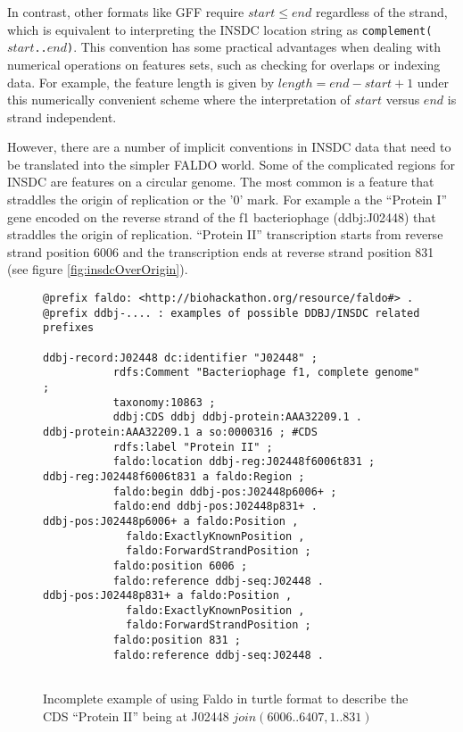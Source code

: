 In contrast, other formats like GFF require $start \leq end$
regardless of the strand, which is equivalent to interpreting
the INSDC location string as \texttt{complement($start$..$end$)}.
This convention has some practical advantages when
dealing with numerical operations on features sets, such as
checking for overlaps or indexing data. For example, the
feature length is given by $length = end - start + 1$ under
this numerically convenient scheme where the interpretation
of $start$ versus $end$ is strand independent.

However, there are a number of implicit conventions in INSDC data that need to be translated into the simpler FALDO world.
Some of the complicated regions for INSDC are features on a circular genome. 
The most common is  a feature that straddles the origin of replication or the '0' mark.
For example a the ``Protein I'' gene encoded on the reverse strand of the f1 bacteriophage (ddbj:J02448) that straddles the origin of replication.
``Protein II'' transcription starts from reverse strand position 6006 and the transcription ends at reverse strand position  831 (see figure \ref{fig:insdcOverOrigin}).


\begin{figure}
\begin{shaded}
\small
\begin{verbatim}
@prefix faldo: <http://biohackathon.org/resource/faldo#> .
@prefix ddbj-.... : examples of possible DDBJ/INSDC related prefixes

ddbj-record:J02448 dc:identifier "J02448" ;
           rdfs:Comment "Bacteriophage f1, complete genome" ;
           taxonomy:10863 ;
           ddbj:CDS ddbj ddbj-protein:AAA32209.1 .
ddbj-protein:AAA32209.1 a so:0000316 ; #CDS
           rdfs:label "Protein II" ;
           faldo:location ddbj-reg:J02448f6006t831 ;
ddbj-reg:J02448f6006t831 a faldo:Region ;
           faldo:begin ddbj-pos:J02448p6006+ ;
           faldo:end ddbj-pos:J02448p831+ .
ddbj-pos:J02448p6006+ a faldo:Position ,
             faldo:ExactlyKnownPosition ,
             faldo:ForwardStrandPosition ;
           faldo:position 6006 ;
           faldo:reference ddbj-seq:J02448 .
ddbj-pos:J02448p831+ a faldo:Position , 
             faldo:ExactlyKnownPosition ,
             faldo:ForwardStrandPosition ;
           faldo:position 831 ;
           faldo:reference ddbj-seq:J02448 .
           
\end{verbatim}
\end{shaded}
\caption{Incomplete example of using Faldo in turtle format to describe
the CDS ``Protein II'' being at J02448 $join(6006..6407,1..831)$}
\label{fig:insdcReverseOverOrigin}
\end{figure}


